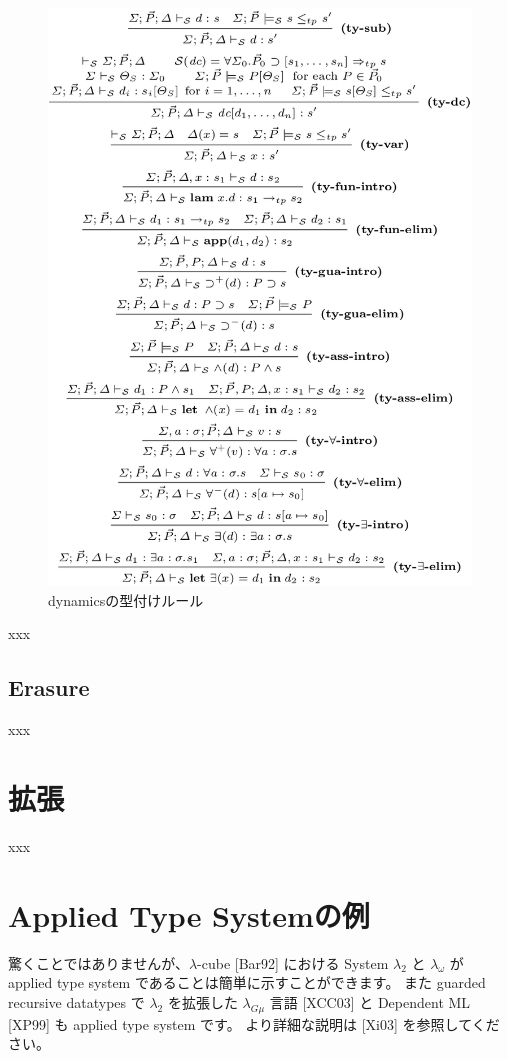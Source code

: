 \documentclass[submit,techreq,noauthor,onecolumn]{ipsj}
\begin{document}
\begin{figure}[h]
\centering
\includegraphics[width=12cm]{img/fig5_typingrules_dynamics.png}
\caption{dynamicsの型付けルール}
\label{fig:fig5_typingrules_dynamics}
\end{figure}

xxx

\subsection{Erasure}

xxx

\section{拡張}

xxx

\section{Applied Type Systemの例}

驚くことではありませんが、$\lambda$-cube [Bar92] における System $\lambda_2$ と $\lambda_{\omega}$ が applied type system であることは簡単に示すことができます。
また guarded recursive datatypes で $\lambda_2$ を拡張した $\lambda_{G\mu}$ 言語 [XCC03] と Dependent ML [XP99] も applied type system です。
より詳細な説明は [Xi03] を参照してください。
\end{document}
